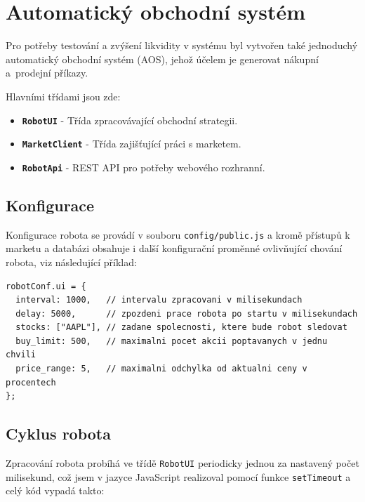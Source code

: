 \documentclass[thesis=M,czech]{FITthesis}[2012/06/26]
\begin{document}
\section{Automatický obchodní systém}
	
	Pro potřeby testování a zvýšení likvidity v systému byl vytvořen také jednoduchý automatický obchodní systém (AOS), jehož účelem je generovat nákupní a~prodejní příkazy.
	
	Hlavními třídami jsou zde:
	
\begin{itemize}

\item \textbf{\texttt{RobotUI}} - Třída zpracovávající obchodní strategii.

\item \textbf{\texttt{MarketClient}} - Třída zajišťující práci s marketem.

\item \textbf{\texttt{RobotApi}} - REST API pro potřeby webového rozhranní.

\end{itemize}


\subsection{Konfigurace}
	
	Konfigurace robota se provádí v souboru \texttt{config/public.js} a kromě přístupů k marketu a databázi obsahuje i další konfigurační proměnné ovlivňující chování robota, viz následující příklad:

\begin{lstlisting}[basicstyle={\tiny\ttfamily}, frame=single] 	
robotConf.ui = {
  interval: 1000,	// intervalu zpracovani v milisekundach
  delay: 5000,		// zpozdeni prace robota po startu v milisekundach
  stocks: ["AAPL"],	// zadane spolecnosti, ktere bude robot sledovat
  buy_limit: 500,	// maximalni pocet akcii poptavanych v jednu chvili
  price_range: 5,	// maximalni odchylka od aktualni ceny v procentech
};
\end{lstlisting}

\subsection{Cyklus robota}

	Zpracování robota probíhá ve třídě \texttt{RobotUI} periodicky jednou za nastavený počet milisekund, což jsem v jazyce JavaScript realizoval pomocí funkce \texttt{setTimeout} a celý kód vypadá takto:
\end{document}
